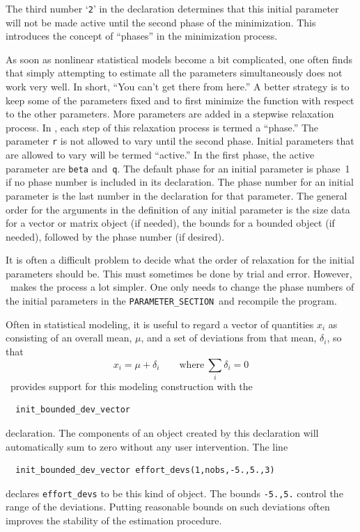 \documentclass{admbmanual}
\newcommand\PS{\texttt{PARAMETER\_SECTION}}
\begin{document}
The third number `\texttt{2}' in the declaration determines that this initial
parameter will not be made active until the second phase of the minimization.
This introduces the concept of ``phases'' in the minimization process.

As soon as nonlinear statistical models become a bit complicated, one often
finds that simply attempting to estimate all the parameters simultaneously does
not work very well. In short, ``You can't get there from here.'' A better
strategy is to keep some of the parameters fixed and to first minimize the
function with respect to the other parameters. More parameters are added in a
stepwise relaxation process. In \ADM, each step of this relaxation process is
termed a ``phase.'' The parameter \texttt{r} is not allowed to vary until the
second phase. Initial parameters that are allowed to vary will be termed
``active.'' In the first phase, the active parameter are \texttt{beta}
and~\texttt{q}. The default phase for an initial parameter is phase~1 if no
phase number is included in its declaration. The phase number for an initial
parameter is the last number in the declaration for that parameter. The general
order for the arguments in the definition of any initial parameter is the size
data for a vector or matrix object (if needed), the bounds for a bounded object
(if needed), followed by the phase number (if desired).

It is often a difficult problem to decide what the order of relaxation for the
initial parameters should be. This must sometimes be done by trial and error.
However, \ADM\ makes the process a lot simpler. One only needs to change the
phase numbers of the initial parameters in the \PS\ and recompile the program.

Often in statistical modeling, it is useful to regard a vector of quantities
{$x_i$} as consisting of an overall mean, $\mu$, and a set of deviations from
that mean, $\delta_i$, so that
$$x_i=\mu+\delta_i \qquad\textrm{where}\ \sum_i \delta_i=0 $$
\ADM\ provides support for this modeling construction with the
\begin{lstlisting}
  init_bounded_dev_vector
\end{lstlisting}
declaration. The components of an object created by this declaration will
automatically sum to zero without any user intervention. The line
\begin{lstlisting}
  init_bounded_dev_vector effort_devs(1,nobs,-5.,5.,3)
\end{lstlisting}
declares \texttt{effort\_devs} to be this kind of object. The bounds
\texttt{-5.,5.} control the range of the deviations. Putting reasonable bounds
on such deviations often improves the stability of the estimation procedure.
\end{document}
